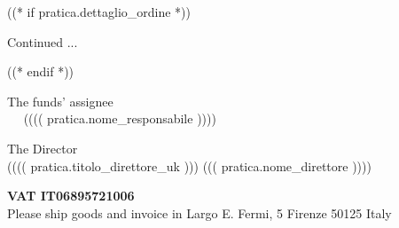\documentclass[a4paper,12pt]{letter}
\begin{document}
((* if pratica.dettaglio_ordine *))
\vspace{0.5cm}
\begin{flushright}
Continued ...
\end{flushright}
\newpage
\vspace{2cm}
\quad
((* endif *))

\vspace{1cm}


\begin{minipage}{\textwidth}
\begin{minipage}[t]{8cm}
\begin{center}
The funds' assignee \\
~~ ({}((( pratica.nome_responsabile )))) ~~ \\
\end{center}
\end{minipage}\hfill\begin{minipage}[t]{8cm}
\begin{center}
The Director \\
({}((( pratica.titolo_direttore_uk ))) ((( pratica.nome_direttore )))) \\
\end{center}
\end{minipage}
\begin{center}
\vspace{14mm}

{\small\bf VAT IT06895721006} \\
{\small Please ship goods and invoice in Largo E. Fermi, 5 Firenze 50125 Italy}
\end{center}
\end{minipage}
\end{document}
